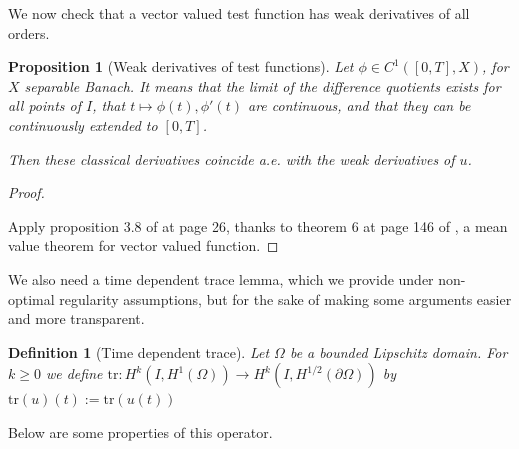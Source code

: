 \documentclass[english,a4paper,9pt,oneside]{scrbook}	%
\theoremstyle{break}
\newtheorem{defn}[equation]{Definition}
\newtheorem{prop}[equation]{Proposition}
\newenvironment{mproof}[1][\proofname]{%
  \begin{proof}[#1]$ $\par\nobreak\ignorespaces
}{%
  \end{proof}
}
\renewcommand*{\proofname}{Proof}
\theoremstyle{remark}
\newcommand{\tr}{\text{tr}}
\newcommand{\emb}{\hookrightarrow}
\begin{document}
\begin{appendices}
%
%
%

We now check that a vector valued test function has weak derivatives of all orders.

\begin{prop}[Weak derivatives of test functions]
\label{prop:weak_class}
Let $\phi \in C^1([0,T],X)$, for $X$ separable Banach. It means that the limit of the difference quotients exists for all points of $I$, that $t\mapsto \phi(t), \phi'(t)$ are continuous, and that they can be continuously extended to $[0,T]$.

Then these classical derivatives coincide a.e. with the weak derivatives of $u$.

\end{prop}
\begin{mproof}


Apply proposition 3.8 of \cite{kreuter} at page 26, thanks to theorem 6 at page 146 of \cite{mvt}, a mean value theorem for vector valued function.
\end{mproof}

We also need a time dependent trace lemma, which we provide under non-optimal regularity assumptions, but for the sake of making some arguments easier and more transparent.

\begin{defn}[Time dependent trace]
Let $\Omega$ be a bounded Lipschitz domain. For $k\geq 0$ we define $\tr: H^k(I,H^1(\Omega))\rightarrow H^k(I, H^{1/2} (\partial \Omega))$ by $\tr(u)(t):=\tr(u(t))$
\end{defn}

Below are some properties of this operator.


\end{appendices}
\end{document}
